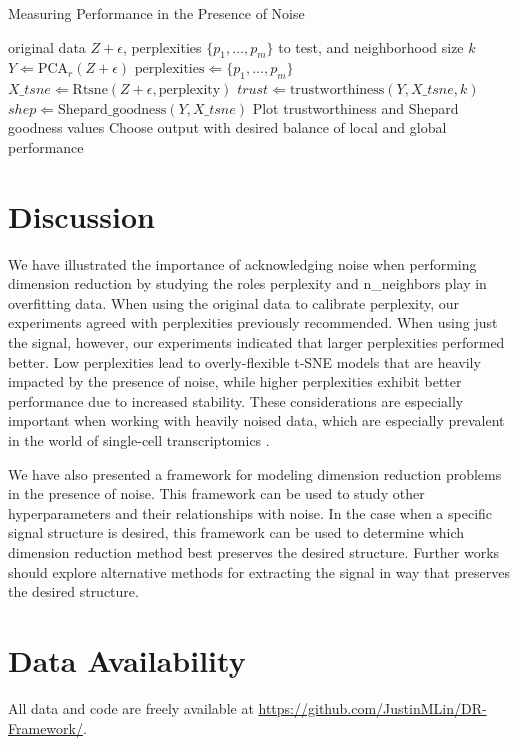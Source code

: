 \documentclass{article}
\begin{document}
\begin{algorithm}[b]
\caption{Measuring Performance in the Presence of Noise}\label{algo1}
\begin{algorithmic}[1]
\Require original data $Z + \epsilon$, perplexities $\{p_1, \hdots, p_m\}$ to test, and neighborhood size $k$
\State $Y \Leftarrow \textrm{PCA}_r(Z + \epsilon)$
\State $\textrm{perplexities} \Leftarrow \{p_1, \hdots, p_m\}$
	\Loop
		\State $X\_tsne \Leftarrow \textrm{Rtsne}(Z + \epsilon, \textrm{perplexity})$
		\State $trust \Leftarrow \textrm{trustworthiness}(Y, X\_tsne, k)$
		\State $shep \Leftarrow \textrm{Shepard\_goodness}(Y, X\_tsne)$
	\EndLoop
\EndFor
\State Plot trustworthiness and Shepard goodness values
\State Choose output with desired balance of local and global performance
\end{algorithmic}
\end{algorithm}

\section{Discussion}
We have illustrated the importance of acknowledging noise when performing dimension reduction by studying the roles perplexity and n\_neighbors play in overfitting data. When using the original data to calibrate perplexity, our experiments agreed with perplexities previously recommended. When using just the signal, however, our experiments indicated that larger perplexities performed better. Low perplexities lead to overly-flexible t-SNE models that are heavily impacted by the presence of noise, while higher perplexities exhibit better performance due to increased stability. These considerations are especially important when working with heavily noised data, which are especially prevalent in the world of single-cell transcriptomics \cite{noise in single-cell data}.

We have also presented a framework for modeling dimension reduction problems in the presence of noise. This framework can be used to study other hyperparameters and their relationships with noise. In the case when a specific signal structure is desired, this framework can be used to determine which dimension reduction method best preserves the desired structure. Further works should explore alternative methods for extracting the signal in way that preserves the desired structure.


\section{Data Availability}
All data and code are freely available at \url{https://github.com/JustinMLin/DR-Framework/}.
\end{document}

